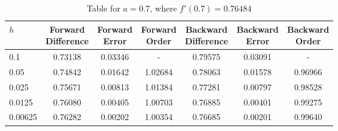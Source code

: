 \begin{table}
\centering
\caption{Table for $a = 0.7$, where $f'(0.7) = 0.76484$}
\begin{tabular}{lcccccc}
\toprule
    $h$ & \makecell{Forward \\ Difference} & \makecell{Forward \\ Error} & \makecell{Forward \\ Order} & \makecell{Backward \\ Difference} & \makecell{Backward \\ Error} & \makecell{Backward \\ Order} \\
\midrule
    0.1 &                          0.73138 &                     0.03346 &                           - &                           0.79575 &                      0.03091 &                            - \\
   0.05 &                          0.74842 &                     0.01642 &                     1.02684 &                           0.78063 &                      0.01578 &                      0.96966 \\
  0.025 &                          0.75671 &                     0.00813 &                     1.01384 &                           0.77281 &                      0.00797 &                      0.98528 \\
 0.0125 &                          0.76080 &                     0.00405 &                     1.00703 &                           0.76885 &                      0.00401 &                      0.99275 \\
0.00625 &                          0.76282 &                     0.00202 &                     1.00354 &                           0.76685 &                      0.00201 &                      0.99640 \\
\bottomrule
\end{tabular}
\end{table}
